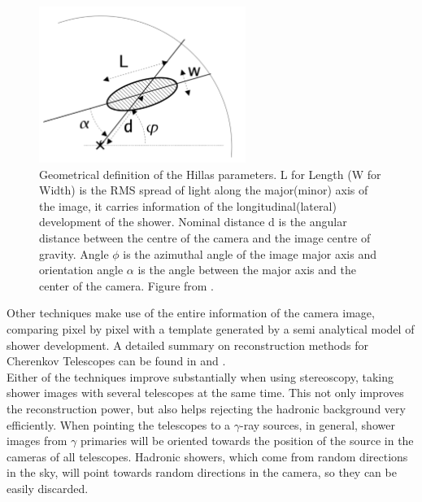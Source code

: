 \documentclass[main.tex]{subfiles}
\begin{document}
\begin{figure}
    \centering
    \includegraphics[width=0.6\textwidth]{Pictures/Hillaspars.pdf}
    \caption{Geometrical definition of the Hillas parameters. L for Length (W for Width) is the RMS spread of light along the major(minor) axis of the image, it carries information of the longitudinal(lateral) development of the shower. Nominal distance d is the angular distance between the centre of the camera and the image centre of gravity. Angle $\phi$ is the azimuthal angle of the image major axis and orientation angle $\alpha$ is the angle between the major axis and the center of the camera. Figure from \cite{2006analysismethodscherenkovtels}. }
    \label{fig:hillas}
\end{figure}

Other techniques make use of the entire information of the camera image, comparing pixel by pixel with a template generated by a semi analytical model of shower development. A detailed summary on reconstruction methods for Cherenkov Telescopes can be found in \cite{2006analysismethodscherenkovtels} and \cite{2015groundbasedtechniques}.\\

Either of the techniques improve substantially when using stereoscopy, taking shower images with several telescopes at the same time. This not only improves the reconstruction power, but also helps rejecting the hadronic background very efficiently. When pointing the telescopes to a $\gamma$-ray sources, in general, shower images from $\gamma$ primaries will be oriented towards the position of the source in the cameras of all telescopes. Hadronic showers, which come from random directions in the sky, will point towards random directions in the camera, so they can be easily discarded. 
\end{document}
